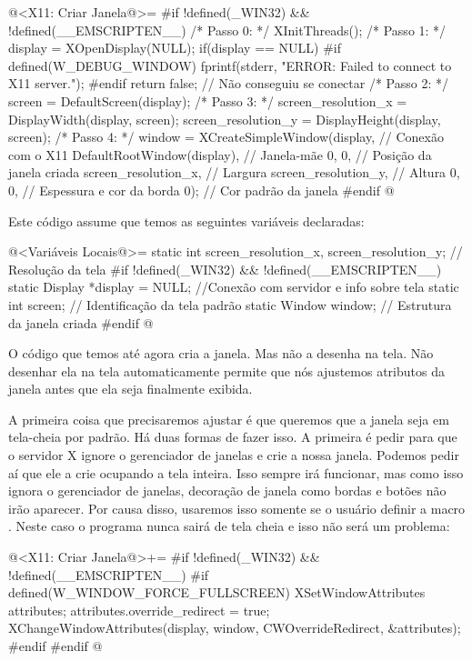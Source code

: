 \iniciocodigo
@<X11: Criar Janela@>=
#if !defined(_WIN32) && !defined(__EMSCRIPTEN__)
/* Passo 0: */
XInitThreads();
/* Passo 1: */
display = XOpenDisplay(NULL);
if(display == NULL){
#if defined(W_DEBUG_WINDOW)
  fprintf(stderr, "ERROR: Failed to connect to X11 server.\n");
#endif
  return false; // Não conseguiu se conectar
}
/* Passo 2: */
screen = DefaultScreen(display);
/* Passo 3: */
screen_resolution_x = DisplayWidth(display, screen);
screen_resolution_y = DisplayHeight(display, screen);
/* Passo 4: */
window = XCreateSimpleWindow(display, // Conexão com o X11
                             DefaultRootWindow(display), // Janela-mãe
                             0, 0, // Posição da janela criada
                             screen_resolution_x, // Largura
                             screen_resolution_y, // Altura
                             0, 0, // Espessura e cor da borda
                             0); // Cor padrão da janela
#endif
@
\fimcodigo

Este código assume que temos as seguintes variáveis declaradas:

\iniciocodigo
@<Variáveis Locais@>=
static int screen_resolution_x, screen_resolution_y; // Resolução da tela
#if !defined(_WIN32) && !defined(__EMSCRIPTEN__)
static Display *display = NULL; //Conexão com servidor e info sobre tela
static int screen;       // Identificação da tela padrão
static Window window;    // Estrutura da janela criada
#endif
@
\fimcodigo

O código que temos até agora cria a janela. Mas não a desenha na
tela. Não desenhar ela na tela automaticamente permite que nós
ajustemos atributos da janela antes que ela seja finalmente exibida.

A primeira coisa que precisaremos ajustar é que queremos que a janela
seja em tela-cheia por padrão. Há duas formas de fazer isso. A
primeira é pedir para que o servidor X ignore o gerenciador de janelas
e crie a nossa janela. Podemos pedir aí que ele a crie ocupando a tela
inteira. Isso sempre irá funcionar, mas como isso ignora o gerenciador
de janelas, decoração de janela como bordas e botões não irão
aparecer. Por causa disso, usaremos isso somente se o usuário definir
a macro . Neste caso o
programa nunca sairá de tela cheia e isso não será um problema:

\iniciocodigo
@<X11: Criar Janela@>+=
#if !defined(_WIN32) && !defined(__EMSCRIPTEN__)
#if defined(W_WINDOW_FORCE_FULLSCREEN)
{
  XSetWindowAttributes attributes;
  attributes.override_redirect = true;
  XChangeWindowAttributes(display, window, CWOverrideRedirect,
                          &attributes);
}
#endif
#endif
@
\fimcodigo

